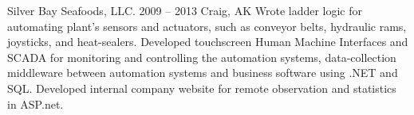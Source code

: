{Silver Bay Seafoods, LLC.}
{2009 -- 2013}
{Craig, AK}
{Wrote ladder logic for automating plant's sensors and actuators, such as conveyor belts, hydraulic rams, joysticks, and heat-sealers. Developed touchscreen Human Machine Interfaces and SCADA for monitoring and controlling the automation systems, data-collection middleware between automation systems and business software using .NET and SQL. Developed internal company website for remote observation and statistics in ASP.net.}
